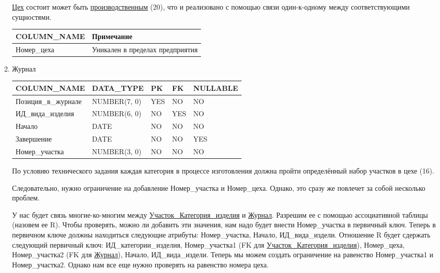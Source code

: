 \begin{enumerate}
\begin{tabular}{|p{4cm}|p{3cm}|p{1cm}|p{1cm}|p{2cm}|}
    \end{tabular}

   \underline{Цех} состоит может быть \underline{производственным} (20), что и реализовано с помощью связи один-к-одному между соответствующими сущностями.

    \begin{tabular}{|p{4cm}|p{5cm}|} \hline

        {\bf COLUMN\_NAME} & {\bf Примечание} \\ \hline
        Номер\_цеха & Уникален в пределах предприятия \\ \hline

    \end{tabular}

    \item{Журнал}

    \begin{tabular}{|p{4cm}|p{3cm}|p{1cm}|p{1cm}|p{2cm}|} \hline

        {\bf COLUMN\_NAME} & {\bf DATA\_TYPE} & {\bf PK} & {\bf FK} & {\bf NULLABLE} \\ \hline
        Позиция\_в\_журнале & NUMBER(7, 0) & YES & NO & NO \\ \hline
        ИД\_вида\_изделия & NUMBER(6, 0) & NO & YES & NO \\ \hline
        Начало & DATE & NO & NO & NO \\ \hline
        Завершение & DATE & NO & NO & YES \\ \hline
        Номер\_участка & NUMBER(3, 0) & NO & NO & NO \\ \hline

    \end{tabular}

    По условию технического задания каждая категория в процессе изготовления должна пройти определённый набор участков в цехе (16).

    Следовательно, нужно ограничение на добавление Номер\_участка и Номер\_цеха.
    Однако, это сразу же повлечет за собой несколько проблем.

    У нас будет связь многие-ко-многим между \underline{Участок\_Категория\_изделия} и \underline{Журнал}.
    Разрешим ее с помощью ассоциативной таблицы (назовем ее R).
    Чтобы проверять, можно ли добавить эти значения, нам надо будет внести Номер\_участка в первичный ключ.
    Теперь в первичном ключе должны находиться следующие атрибуты: Номер\_участка, Начало, ИД\_вида\_издели.
    Отношение R будет сдержать следующий первичный ключ: ИД\_категории\_изделия, Номер\_участка1 (FK для \underline{Участок\_Категория\_изделия}), Номер\_цеха, Номер\_участка2 (FK для \underline{Журнал}), Начало, ИД\_вида\_издели.
    Теперь мы можем создать ограничение на равенство Номер\_участка1 и Номер\_участка2.
    Однако нам все еще нужно проверять на равенство номера цеха.



\end{enumerate}
